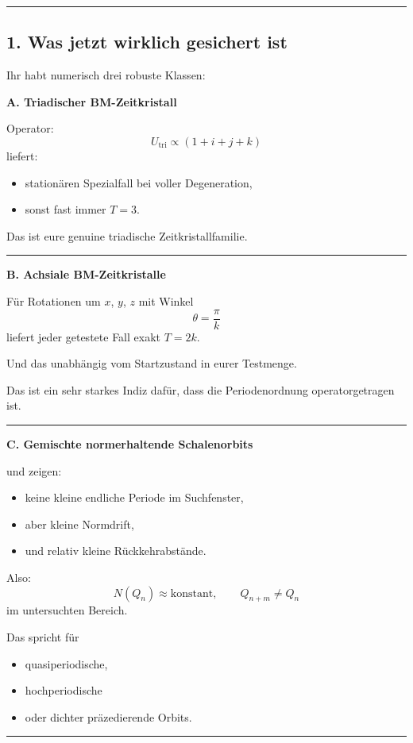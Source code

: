 \documentclass[11pt,a4paper]{article}
\theoremstyle{definition}
\begin{document}
	\medskip\hrule\medskip
	
	\subsection*{1. Was jetzt wirklich gesichert ist}
	
	Ihr habt numerisch drei robuste Klassen:
	
	\textbf{A. Triadischer BM-Zeitkristall}
	
	Operator:
	\[
	U_{\mathrm{tri}} \propto (1+i+j+k)
	\]
	liefert:
	\begin{itemize}
		\item stationären Spezialfall bei voller Degeneration,
		\item sonst fast immer $T=3$.
	\end{itemize}
	Das ist eure genuine triadische Zeitkristallfamilie.
	
	\medskip\hrule\medskip
	
	\textbf{B. Achsiale BM-Zeitkristalle}
	
	Für Rotationen um $x$, $y$, $z$ mit Winkel
	\[
	\theta=\frac{\pi}{k}
	\]
	liefert jeder getestete Fall exakt $T=2k$.
	
	Und das unabhängig vom Startzustand in eurer Testmenge.
	
	Das ist ein sehr starkes Indiz dafür, dass die Periodenordnung operatorgetragen ist.
	
	\medskip\hrule\medskip
	
	\textbf{C. Gemischte normerhaltende Schalenorbits}
	
	\texttt{} und \texttt{} zeigen:
	\begin{itemize}
		\item keine kleine endliche Periode im Suchfenster,
		\item aber kleine Normdrift,
		\item und relativ kleine Rückkehrabstände.
	\end{itemize}
	Also:
	\[
	N(Q_n)\approx \text{konstant},
	\qquad
	Q_{n+m}\neq Q_n
	\]
	im untersuchten Bereich.
	
	Das spricht für
	\begin{itemize}
		\item quasiperiodische,
		\item hochperiodische
		\item oder dichter präzedierende Orbits.
	\end{itemize}
	
	\medskip\hrule\medskip
	
\end{document}
